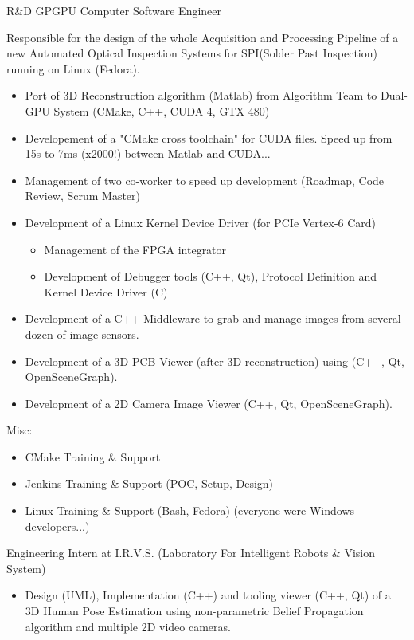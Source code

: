 \documentclass{article}
\begin{document}
\begin{llist}
 {
R\&D GPGPU Computer Software Engineer\\
\vspace{-0.33cm}

Responsible for the design of the whole Acquisition and Processing Pipeline of a
	new Automated Optical Inspection Systems for SPI(Solder Past Inspection)
	running on Linux (Fedora).
\begin{itemize}
\item Port of 3D Reconstruction algorithm (Matlab) from Algorithm Team to Dual-GPU System (CMake, C++, CUDA 4, GTX 480)
\item Developement of a "CMake cross toolchain" for CUDA files.
 Speed up from 15s to 7ms (x2000!) between Matlab and CUDA...
\item Management of two co-worker to speed up development (Roadmap, Code Review, Scrum Master)
\item Development of a Linux Kernel Device Driver (for PCIe Vertex-6 Card)
\begin{itemize}
\item Management of the FPGA integrator
\item Development of Debugger tools (C++, Qt), Protocol Definition and Kernel Device Driver (C)
\end{itemize}
\item Development of a C++ Middleware to grab and manage images from several dozen of image sensors.
\item Development of a 3D PCB Viewer (after 3D reconstruction) using (C++, Qt, OpenSceneGraph).
\item Development of a 2D Camera Image Viewer (C++, Qt, OpenSceneGraph).
\end{itemize}
Misc:
\begin{itemize}
\item CMake Training \& Support
\item Jenkins Training \& Support (POC, Setup, Design)
\item Linux Training \& Support (Bash, Fedora) (everyone were Windows developers...)
\end{itemize}
} {}


 {
Engineering Intern at I.R.V.S. (Laboratory For Intelligent Robots \& Vision System)
\vspace{-0.33cm}
\begin{itemize}
\item Design (UML), Implementation (C++) and tooling viewer (C++, Qt) of a
3D Human Pose Estimation using non-parametric Belief Propagation
algorithm and multiple 2D video cameras.
\end{itemize}
} {}


\end{llist}
\end{document}
